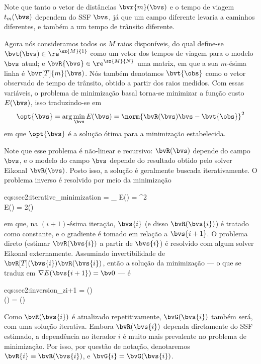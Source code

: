 Note que tanto o vetor de distâncias $\bvr{m}(\bvs)$ e o tempo de viagem $t_m(\bvs)$ dependem do SSF $\bvs$, já que um campo diferente levaria a caminhos diferentes, e também a um tempo de trânsito diferente.

Agora nós consideramos todos os $M$ raios disponíveis, do qual define-se $\bvt(\bvs) \in \re^{\sz{M}{1}}$ como um vetor dos tempos de viagem para o modelo $\bvs$ atual; e $\bvR{\bvs} \in \re^{\sz{M}{N}}$ uma matrix, em que a sua $m$-ésima linha é $\bvr[T]{m}(\bvs)$. Nós também denotamos $\bvt{\obs}$ como o vetor observado de tempo de trânsito, obtido a partir dos raios medidos. Com essas variáveis, o problema de minimização basal torna-se minimizar a função custo $E(\bvs)$, isso traduzindo-se em
\begin{equation}
	\opt{\bvs} = \arg\min_{\bvs} E(\bvs) = \norm{\bvR(\bvs) \bvs - \bvt{\obs}}^2
	\label{eq:sec2:def_minimization_bvz}
\end{equation}
em que $\opt{\bvs}$ é a solução ótima para a minimização estabelecida.

Note que esse problema é não-linear e recursivo: $\bvR(\bvs)$ depende do campo $\bvs$, e o modelo do campo $\bvs$ depende do resultado obtido pelo solver Eikonal $\bvR(\bvs)$. Posto isso, a solução é geralmente buscada iterativamente. O problema inverso é resolvido por meio da minimização
\begin{subgather}{eqs:sec2:iterative_minimization}
	 = \arg\min_{} E() = ^2 
	\label{subeq:sec2:iterative_minimization:eq1}\\
	\nabla E() = 2\tr{\bvR}() 
	\label{subeq:sec2:iterative_minimization:eq2}
\end{subgather}
em que, na $(i+1)$-ésima iteração, $\bvs{i}$ (e disso $\bvR(\bvs{i})$) é tratado como constante, e o gradiente é tomado em relação a $\bvs{i+1}$. O problema direto (estimar $\bvR(\bvs{i})$ a partir de $\bvs{i}$) é resolvido com algum solver Eikonal externamente. Assumindo invertibilidade de $\bvR[T](\bvs{i})\bvR(\bvs{i})$, então a solução da minimização --- o que se traduz em $\nabla E(\bvs{i+1}) = \bv0$ --- é
\begin{subgather}{eqs:sec2:inversion_zi+1}
	 = \bvG() \bvt{\obs} \\
	\bvG() =  \tr{\bvR}()
\end{subgather}

Como $\bvR(\bvs{i})$ é atualizado repetitivamente, $\bvG(\bvs{i})$ também será, com uma solução iterativa. Embora $\bvR(\bvs{i})$ dependa diretamente do SSF estimado, a dependência no iterador $i$ é muito mais prevalente no problema de minimização. Por isso, por questão de notação, denotaremos $\bvR{i} \equiv \bvR(\bvs{i})$, e $\bvG{i} = \bvG(\bvs{i})$.

